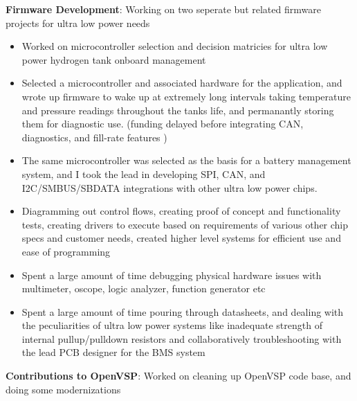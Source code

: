 \documentclass[letterpaper,10pt]{article}
\newcommand{\resumeItem}[2]{
  \item\small{
    \textbf{#1}{: #2 \vspace{-2pt}}
  }
}
\begin{document}
           \resumeItem{Firmware Development} {Working on two seperate but related firmware projects for ultra low power needs}
          \begin{itemize}
              \item Worked on microcontroller selection and decision matricies for ultra low power hydrogen tank onboard management
              \item Selected a microcontroller and associated hardware for the application, and wrote up firmware to wake up at extremely long intervals taking temperature and pressure readings throughout the tanks life, and permanantly storing them for diagnostic use. (funding delayed before integrating CAN, diagnostics, and fill-rate features )
              \item The same microcontroller was selected as the basis for a battery management system, and I took the lead in developing SPI, CAN, and I2C/SMBUS/SBDATA integrations with other ultra low power chips.
              \item Diagramming out control flows, creating proof of concept and functionality tests, creating drivers to execute based on requirements of various other chip specs and customer needs, created higher level systems for efficient use and ease of programming
              \item Spent a large amount of time debugging physical hardware issues with multimeter, oscope, logic analyzer, function generator etc 
              \item Spent a large amount of time pouring through datasheets, and dealing with the peculiarities of ultra low power systems like inadequate strength of internal pullup/pulldown resistors and collaboratively troubleshooting with the lead PCB designer for the BMS system
          \end{itemize}
          
      \resumeItem{Contributions to OpenVSP} {Worked on cleaning up OpenVSP code base, and doing some modernizations}
 	
\end{document}
